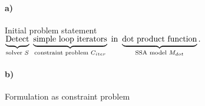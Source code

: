 
\raggedright
\paragraph*{a)} Initial problem statement\\[1em]

\centering
{\LARGE$\underbrace{\text{Detect\vphantom{p}}}
                  _{\text{solver }S}
      \ \underbrace{\text{simple loop iterators}}
                  _{\text{constraint problem }C_{iter}}
                  \ \text{in}
      \ \underbrace{\text{dot product function}}
                  _{\text{SSA model }M_{dot}}
                    \text{.}$}\\[2em]

\raggedright
\paragraph*{b)} Formulation as constraint problem\\[1em]


